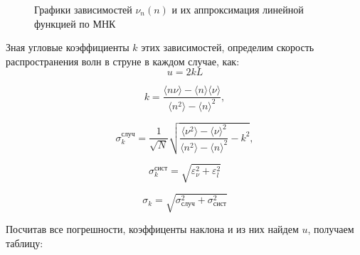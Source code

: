 \documentclass[
a4paper, %
12pt, %
]{article}
\begin{document}
	\begin{figure}[h]
		\caption{Графики зависимостей $\nu_n(n)$ и их аппроксимация линейной функцией по МНК}
		\label{mnk_graph}
	\end{figure}
	
	\newpage
	
	Зная угловые коэффициенты $k$ этих зависимостей, определим скорость распространения волн в струне в каждом случае, как:
	\[u = 2kL \]
	
	\begin{equation}
		k=\frac{\langle n\nu\rangle-\langle n\rangle \langle \nu\rangle}{\langle n^2\rangle - \langle n\rangle^2},
	\end{equation}
	
	\begin{equation}
		\sigma_k^\text{случ}=\frac{1}{\sqrt{N}}\sqrt{\frac{\langle \nu^2 \rangle - \langle \nu \rangle^2}{\langle n^2 \rangle - \langle n \rangle^2} - k^2  },
	\end{equation}
	
	\begin{equation}
		\sigma_k^{\text{сист}} = \sqrt{ \varepsilon_\nu^2 + \varepsilon_l^2 }
	\end{equation}
	
	\begin{equation}
		\sigma_k = \sqrt{\sigma_\text{случ}^2 + \sigma_\text{сист}^2}
	\end{equation}
	
	Посчитав все погрешности, коэффиценты наклона и из них найдем $u$, получаем таблицу:
	
\end{document}
